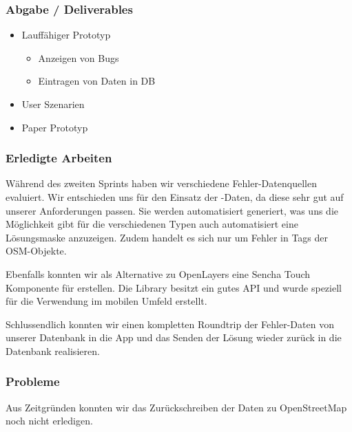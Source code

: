 \subsubsection{Abgabe / Deliverables}

\begin{itemize}
	\item Lauffähiger Prototyp
	\begin{itemize}
		\item Anzeigen von Bugs
		\item Eintragen von Daten in DB
	\end{itemize}
	\item User Szenarien
	\item Paper Prototyp
\end{itemize}

\subsubsection{Erledigte Arbeiten}
Während des zweiten Sprints haben wir verschiedene Fehler-Datenquellen evaluiert. Wir entschieden uns für den Einsatz der -Daten, da diese sehr gut auf unserer Anforderungen passen. Sie werden automatisiert generiert, was uns die Möglichkeit gibt für die verschiedenen Typen auch automatisiert eine Lösungsmaske anzuzeigen. Zudem handelt es sich nur um Fehler in Tags der OSM-Objekte.

Ebenfalls konnten wir als Alternative zu OpenLayers eine Sencha Touch Komponente für  erstellen.
Die Library besitzt ein gutes API und wurde speziell für die Verwendung im mobilen Umfeld erstellt.

Schlussendlich konnten wir einen kompletten Roundtrip der Fehler-Daten von unserer Datenbank in die App und das Senden der Lösung wieder zurück in die Datenbank realisieren.

\subsubsection{Probleme}
Aus Zeitgründen konnten wir das Zurückschreiben der Daten zu \gls{OpenStreetMap} noch nicht erledigen.